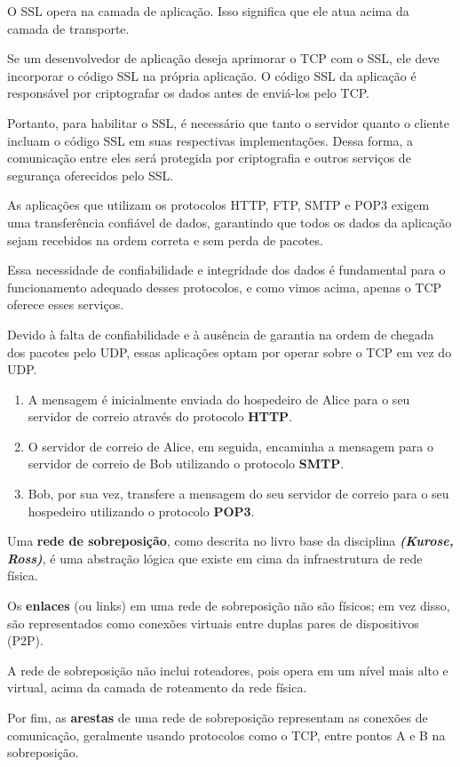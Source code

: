 \documentclass{homework}
\begin{document}
\begin{exercise}[R9)]
     O SSL opera na camada de aplicação. Isso significa que ele atua acima da camada de transporte.
     
     Se um desenvolvedor de aplicação deseja aprimorar o TCP com o SSL, ele deve incorporar o código SSL na própria aplicação. O código SSL da aplicação é responsável por criptografar os dados antes de enviá-los pelo TCP.
     
     Portanto, para habilitar o SSL, é necessário que tanto o servidor quanto o cliente incluam o código SSL em suas respectivas implementações. Dessa forma, a comunicação entre eles será protegida por criptografia e outros serviços de segurança oferecidos pelo SSL.
\end{exercise}
\begin{exercise}[R11)]
    As aplicações que utilizam os protocolos HTTP, FTP, SMTP e POP3 exigem uma transferência confiável de dados, garantindo que todos os dados da aplicação sejam recebidos na ordem correta e sem perda de pacotes. 
    
    Essa necessidade de confiabilidade e integridade dos dados é fundamental para o funcionamento adequado desses protocolos, e como vimos acima, apenas o TCP oferece esses serviços.
    
    Devido à falta de confiabilidade e à ausência de garantia na ordem de chegada dos pacotes pelo UDP, essas aplicações optam por operar sobre o TCP em vez do UDP.
    \end{exercise}
\begin{exercise}[R16)]
    \begin{enumerate}
  \item A mensagem é inicialmente enviada do hospedeiro de Alice para o seu servidor de correio através do protocolo \textbf{HTTP}.

  \item O servidor de correio de Alice, em seguida, encaminha a mensagem para o servidor de correio de Bob utilizando o protocolo \textbf{SMTP}.

  \item Bob, por sua vez, transfere a mensagem do seu servidor de correio para o seu hospedeiro utilizando o protocolo \textbf{POP3}.
\end{enumerate}
\end{exercise}
\begin{exercise}[R23)]
    Uma \textbf{rede de sobreposição}, como descrita no livro base da disciplina \textit{\textbf{(Kurose, Ross)}}, é uma abstração lógica que existe em cima da infraestrutura de rede física.

    Os \textbf{enlaces} (ou links) em uma rede de sobreposição não são físicos; em vez disso, são representados como conexões virtuais entre duplas pares de dispositivos (P2P).
    
    A rede de sobreposição não inclui roteadores, pois opera em um nível mais alto e virtual, acima da camada de roteamento da rede física.
    
    Por fim, as \textbf{arestas} de uma rede de sobreposição representam as conexões de comunicação, geralmente usando protocolos como o TCP, entre pontos A e B na sobreposição. 
\end{exercise}
\end{document}
